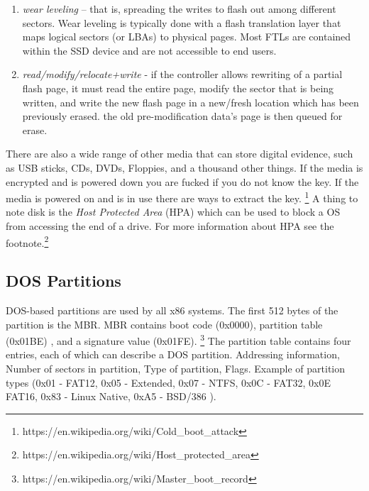 \begin{enumerate}
    \item \textit{wear leveling} – that is, spreading the writes to flash out 
        among different sectors. Wear leveling is typically done with a flash 
        translation layer that maps logical sectors (or LBAs) to physical pages.
        Most FTLs are contained within the SSD device and are not accessible to 
        end users.

    \item \textit{read/modify/relocate+write} - if the controller allows 
        rewriting of a partial flash page, it must read the entire page, modify 
        the sector that is being written, and write the new flash page in a 
        new/fresh location which has been previously erased. the old 
        pre-modification data's page is then queued for erase.
\end{enumerate}
There are also a wide range of other media that can store digital evidence, such
as USB sticks, CDs, DVDs, Floppies, and a thousand other things. If the media is
encrypted and is powered down you are fucked if you do not know the key. If the
media is powered on and is in use there are ways to extract the key.
\footnote{https://en.wikipedia.org/wiki/Cold\_boot\_attack} A thing to note 
disk is the \textit{Host Protected Area} (HPA) which can be used to block a OS
from accessing the end of a drive. For more information about HPA see the 
footnote.\footnote{https://en.wikipedia.org/wiki/Host\_protected\_area}

\subsection{DOS Partitions}
DOS-based partitions are used by all x86 systems. The first 512 bytes of the
partition is the MBR. MBR contains boot code (0x0000), partition table (0x01BE)
, and a signature value (0x01FE).
\footnote{https://en.wikipedia.org/wiki/Master\_boot\_record}
The partition table contains four entries, each of which can describe a DOS 
partition. Addressing information, Number of sectors in partition, Type of 
partition, Flags. Example of partition types (0x01 - FAT12, 0x05 - Extended, 
0x07 - NTFS, 0x0C - FAT32, 0x0E FAT16, 0x83 - Linux Native, 0xA5 - BSD/386 ).

